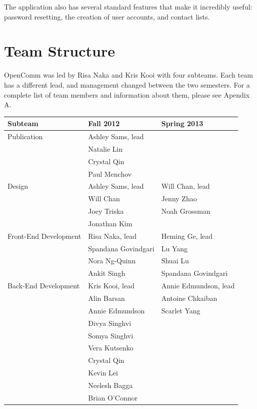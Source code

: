 \documentclass[12pt, letterpaper]{article}
\begin{document}
The application also has several standard features that make it incredibly useful: password resetting, the creation of user accounts, and contact lists. 

\section{Team Structure}
OpenComm was led by Risa Naka and Kris Kooi with four subteams.  Each team has a different lead, and management changed between the two semesters.  For a complete list of team members and information about them, please see Apendix A.  

\begin{table}[tb]
\centering
\begin{tabular}{| l | l | l |}
\hline
Subteam & Fall 2012 & Spring 2013\\
\hline
\hline
Publication & Ashley Sams, lead &  \\
  & Natalie Lin &  \\
  & Crystal Qin & \\
  & Paul Menchov & \\
\hline
Design & Ashley Sams, lead & Will Chan, lead\\
  & Will Chan & Jenny Zhao\\
  & Joey Triska & Noah Grossman\\
  & Jonathan Kim & \\
\hline
Front-End Development & Risa Naka, lead & Heming Ge, lead\\
  & Spandana Govindgari & Lu Yang\\
  & Nora Ng-Quinn & Shuai Lu\\
  & Ankit Singh & Spandana Govindgari\\
\hline
Back-End Development & Kris Kooi, lead & Annie Edmundson, lead\\
  & Alin Barsan & Antoine Chkaiban\\
  & Annie Edmundson & Scarlet Yang\\
  & Divya Singhvi &  \\
  & Somya Singhvi &  \\
  & Vera Kutsenko &  \\
  & Crystal Qin & \\
  & Kevin Lei & \\
  & Neelesh Bagga & \\
  & Brian O'Connor & \\
\hline
\end{tabular}
\vspace{0.3cm}
\end{table}
\end{document}
